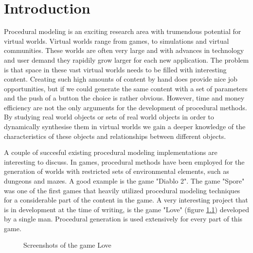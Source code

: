 
\chapter{Introduction}
\label{sec:intro}


Procedural modeling is an exciting research area with trumendous potential for virtual worlds. Virtual worlds range from games, to simulations and virtual communities. These worlds are often very large and with advances in technology and user demand they rapidily grow larger for each new application. The problem is that space in these vast virtual worlds needs to be filled with interesting content. Creating such high amounts of content by hand does provide nice job opportunities, but if we could generate the same content with a set of parameters and the push of a button the choice is rather obvious. However, time and money efficiency are not the only arguments for the development of procedural methods. By studying real world objects or sets of real world objects in order to dynamically synthesise them in virtual worlds we gain a deeper knowledge of the characteristics of these objects and relationships between different objects. 

A couple of succesful existing procedural modeling implementations are interesting to discuss. In games, procedural methods have been employed for the generation of worlds with restricted sets of environmental elements, such as dungeons and mazes. A good example is the game "Diablo 2". The game "Spore" was one of the first games that heavily utilized procedural modeling techniques for a considerable part of the content in the game. A very interesting project that is in development at the time of writing, is the game "Love" (figure \ref{fig:love}) developed by a single man. Procedural generation is used extensively for every part of this game.
      
\begin{figure}[htb]
\centering
{}

\label{fig:love}
\caption[]{Screenshots of the game Love}
\end{figure}


